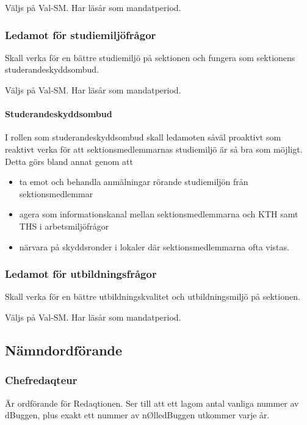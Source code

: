 \documentclass{dgovdoc}
\begin{document}
Väljs på Val-SM. Har läsår som mandatperiod.

\subsubsection{Ledamot för studiemiljöfrågor}

Skall verka för en bättre studiemiljö på sektionen och fungera som sektionens
studerandeskyddsombud.

Väljs på Val-SM. Har läsår som mandatperiod.

\paragraph{Studerandeskyddsombud}

I rollen som studerandeskyddsombud skall ledamoten såväl proaktivt som reaktivt
verka för att sektionsmedlemmarnas studiemiljö är så bra som möjligt. Detta
görs bland annat genom att

\begin{itemize}
  \item ta emot och behandla anmälningar rörande studiemiljön från
    sektionsmedlemmar
  \item agera som informationskanal mellan sektionsmedlemmarna och KTH samt THS
    i arbetsmiljöfrågor
  \item närvara på skyddsronder i lokaler där sektionsmedlemmarna ofta vistas.
\end{itemize}

\subsubsection{Ledamot för utbildningsfrågor}

Skall verka för en bättre utbildningskvalitet och utbildningsmiljö på
sektionen.

Väljs på Val-SM. Har läsår som mandatperiod.

\subsection{Nämndordförande}

\subsubsection{Chefredaqteur}

Är ordförande för Redaqtionen. Ser till att ett lagom antal vanliga nummer av
dBuggen, plus exakt ett nummer av nØlledBuggen utkommer varje år.
\end{document}
